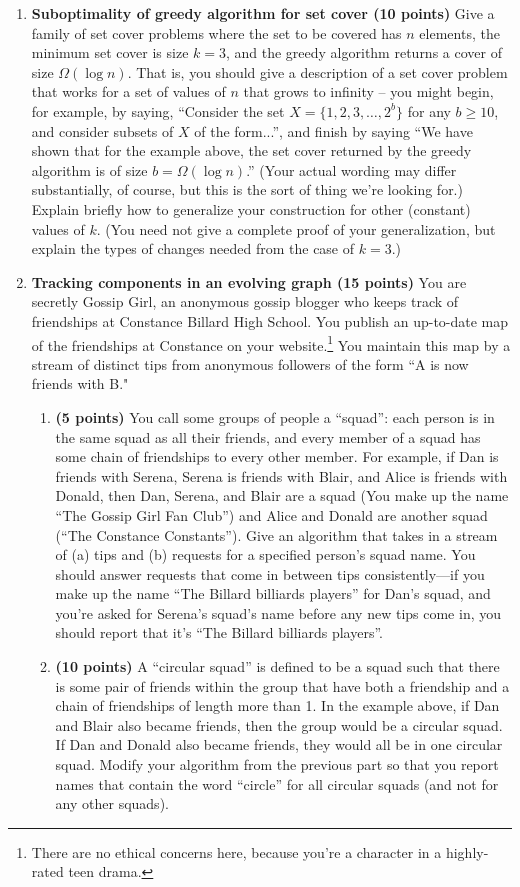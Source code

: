 \documentclass[11pt]{article}
\begin{document}
\begin{enumerate}
\item {\bf Suboptimality of greedy algorithm for set cover (10 points)}
Give a family of set cover problems where the set to be covered
has $n$ elements, the minimum set cover is size $k = 3$, and the
greedy algorithm returns a cover of size $\Omega(\log n)$.  That is,
you should give a description of a set cover problem that works for a
set of values of $n$ that grows to infinity -- you might begin, for
example, by saying, ``Consider the set $X = \{1,2,3,\ldots,2^b\}$ for
any $b \geq 10$, and consider subsets of $X$ of the form...'', and
finish by saying ``We have shown that for the example above, the set
cover returned by the greedy algorithm is of size $b = \Omega(\log
n)$.''  (Your actual wording may differ substantially, of course, but
this is the sort of thing we're looking for.)  Explain briefly how to
generalize your construction for other (constant) values of $k$.  (You
need not give a complete proof of your generalization, but explain the
types of changes needed from the case of $k=3$.)


\item {\bf Tracking components in an evolving graph (15 points)}
You are secretly Gossip Girl, an anonymous gossip blogger who keeps track of friendships at Constance Billard High School. You publish an up-to-date map of the friendships at Constance on your website.\footnote{There are no ethical concerns here, because you're a character in a highly-rated teen drama.} You maintain this map by a stream of distinct tips from anonymous followers of the form ``A is now friends with B." 

\begin{enumerate}
\item {\bf (5 points)}
    You call some groups of people a ``squad'': each person is in the same squad as all their friends, and every member of a squad has some chain of friendships to every other member. For example, if Dan is friends with Serena, Serena is friends with Blair, and Alice is friends with Donald, then Dan, Serena, and Blair are a squad (You make up the name ``The Gossip Girl Fan Club'') and Alice and Donald are another squad (``The Constance Constants''). Give an algorithm that takes in a stream of (a) tips and (b) requests for a specified person's squad name. You should answer requests that come in between tips consistently---if you make up the name ``The Billard billiards players'' for Dan's squad, and you're asked for Serena's squad's name before any new tips come in, you should report that it's ``The Billard billiards players''.
\item {\bf (10 points)}
    A ``circular squad'' is defined to be a squad such that there is some pair of friends within the group that have both a friendship and a chain of friendships of length more than 1. In the example above, if Dan and Blair also became friends, then the group would be a circular squad. If Dan and Donald also became friends, they would all be in one circular squad. Modify your algorithm from the previous part so that you report names that contain the word ``circle'' for all circular squads (and not for any other squads).
\end{enumerate}


\end{enumerate}
\end{document}
